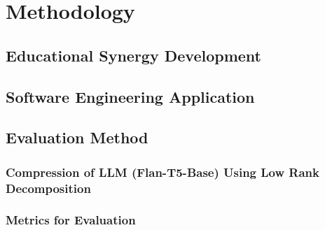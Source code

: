 \chapter{Methodology}

\section{Educational Synergy Development}

\section{Software Engineering Application}

\section{Evaluation Method}
    \subsection{Compression of LLM (Flan-T5-Base) Using Low Rank Decomposition}

    \subsection{Metrics for Evaluation}

